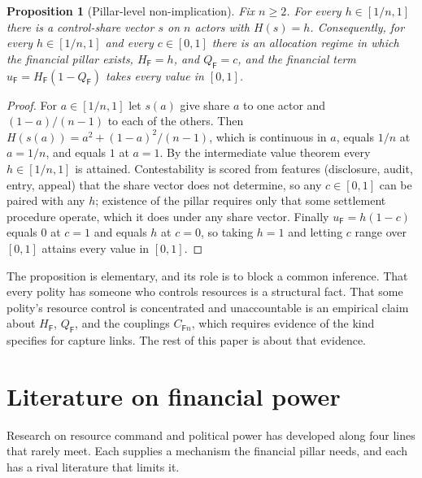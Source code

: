 \documentclass[11pt,letterpaper]{article}
\newtheorem{proposition}[theorem]{Proposition}
\theoremstyle{definition}
\theoremstyle{remark}
\newcommand{\pF}{\mathsf{F}}
\begin{document}
\begin{proposition}[Pillar-level non-implication]
\label{prop:financial-power:nonimplication}
Fix $n\geq 2$. For every $h\in[1/n,1]$ there is a control-share vector $s$ on $n$ actors with $H(s)=h$. Consequently, for every $h\in[1/n,1]$ and every $c\in[0,1]$ there is an allocation regime in which the financial pillar exists, $H_{\pF}=h$, and $Q_{\pF}=c$, and the financial term $u_{\pF}=H_{\pF}(1-Q_{\pF})$ takes every value in $[0,1]$.
\end{proposition}

\begin{proof}
For $a\in[1/n,1]$ let $s(a)$ give share $a$ to one actor and $(1-a)/(n-1)$ to each of the others. Then $H(s(a))=a^2+(1-a)^2/(n-1)$, which is continuous in $a$, equals $1/n$ at $a=1/n$, and equals $1$ at $a=1$. By the intermediate value theorem every $h\in[1/n,1]$ is attained. Contestability is scored from features (disclosure, audit, entry, appeal) that the share vector does not determine, so any $c\in[0,1]$ can be paired with any $h$; existence of the pillar requires only that some settlement procedure operate, which it does under any share vector. Finally $u_{\pF}=h(1-c)$ equals $0$ at $c=1$ and equals $h$ at $c=0$, so taking $h=1$ and letting $c$ range over $[0,1]$ attains every value in $[0,1]$.
\end{proof}

The proposition is elementary, and its role is to block a common inference. That every polity has someone who controls resources is a structural fact. That some polity's resource control is concentrated and unaccountable is an empirical claim about $H_{\pF}$, $Q_{\pF}$, and the couplings $C_{\pF n}$, which requires evidence of the kind \citet{largo2026hbs} specifies for capture links. The rest of this paper is about that evidence.

\section{Literature on financial power}
\label{sec:literature}

Research on resource command and political power has developed along four lines that rarely meet. Each supplies a mechanism the financial pillar needs, and each has a rival literature that limits it.
\end{document}
